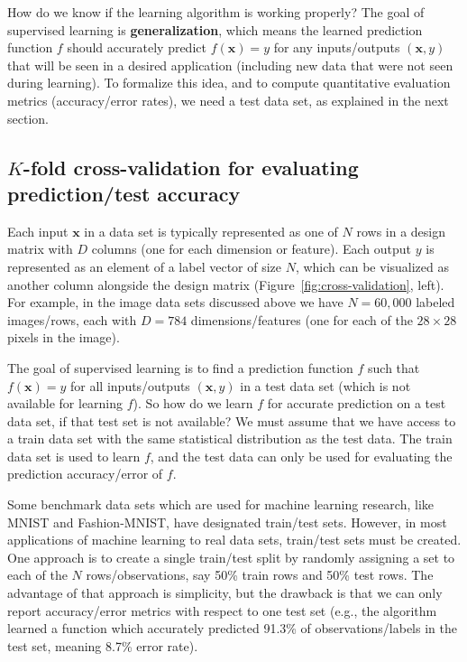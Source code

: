 \documentclass[12pt]{article}
\newcommand{\keyword}[1]{\textbf{#1}}
\begin{document}
How do we know if the learning algorithm is working properly? The goal
of supervised learning is \keyword{generalization}, which means the
learned prediction function $f$ should accurately predict
$f(\mathbf x) = y$ for any inputs/outputs $(\mathbf x,y)$ that will be
seen in a desired application (including new data that were not seen
during learning). To formalize this idea, and to compute quantitative
evaluation metrics (accuracy/error rates), we need a test data set, as
explained in the next section.

\subsection{$K$-fold cross-validation for evaluating prediction/test accuracy}

Each input $\mathbf x$ in a data set is typically represented as one
of $N$ rows in a design matrix with $D$ columns (one for each
dimension or feature). Each output $y$ is represented as an element of
a label vector of size $N$, which can be visualized as another column
alongside the design matrix (Figure~\ref{fig:cross-validation},
left). For example, in the image data sets discussed above we have
$N=60,000$ labeled images/rows, each with $D=784$ dimensions/features
(one for each of the $28\times 28$ pixels in the image).

The goal of supervised learning is to find a prediction function $f$
such that $f(\mathbf x) = y$ for all inputs/outputs $(\mathbf x,y)$ in
a test data set (which is not available for learning
$f$). So how do we learn $f$ for accurate prediction on a test data
set, if that test set is not available? We must assume that we have
access to a train data set with the same statistical distribution as
the test data. The train data set is used to learn $f$, and the test
data can only be used for evaluating the prediction accuracy/error of
$f$.

Some benchmark data sets which are used for machine learning research,
like MNIST and Fashion-MNIST, have designated train/test
sets. However, in most applications of machine learning to real data
sets, train/test sets must be created. One approach is to create a
single train/test split by randomly assigning a set to each of the $N$
rows/observations, say 50\% train rows and 50\% test rows. The
advantage of that approach is simplicity, but the drawback is that we
can only report accuracy/error metrics with respect to one test set
(e.g., the algorithm learned a function which accurately predicted
91.3\% of observations/labels in the test set, meaning 8.7\% error
rate). 
\end{document}
